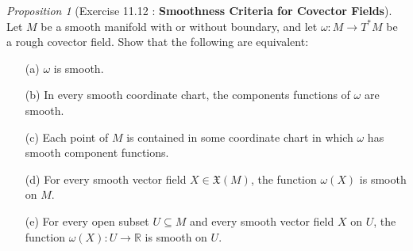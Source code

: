 \documentclass[a4paper]{article}
\theoremstyle{remark}
\newtheorem{prop}{Proposition}
\newcommand{\er}{\mathbb{R}} %
\newcommand{\subhim}{\subseteq} %
\newcommand{\VF}{\mathfrak{X}} %
\begin{document}
\begin{prop}[Exercise 11.12 : \textbf{Smoothness Criteria for Covector Fields}]
Let $M$ be a smooth manifold with or without boundary, and let $\omega : M \to T^*M$ be a rough covector field. Show that the following are equivalent:
\begin{enumerate}[nolistsep]
\item[(a)] $\omega$ is smooth.
\item[(b)] In every smooth coordinate chart, the components functions of $\omega$ are smooth.
\item[(c)] Each point of $M$ is contained in some coordinate chart in which $\omega$ has smooth component functions.
\item[(d)] For every smooth vector field $X \in \VF(M)$, the function  $\omega(X)$ is smooth on $M$.
\item[(e)] For every open subset $U \subhim M$ and every smooth vector field $X$ on $U$, the function $\omega(X) : U \to \er$ is smooth on $U$.
\end{enumerate} 
\end{prop}
\end{document}
